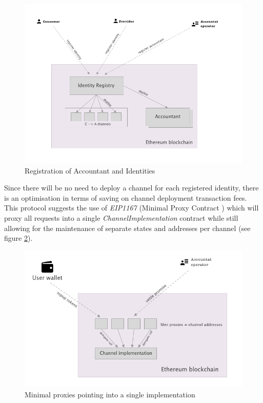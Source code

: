 \documentclass[a4paper,12pt]{article}
\begin{document}
\begin{figure}[H]
    \centering
    \includegraphics[scale=0.4]{../img/registration}
    \caption{Registration of Accountant and Identities}
    \label{img:registration}
\end{figure}

Since there will be no need to deploy a channel for each registered identity, 
there is an optimisation in terms of saving on channel deployment transaction 
fees. This protocol suggests the use of \textit{EIP1167} (Minimal Proxy Contract
\cite{eip1167}) which will proxy all requests into a single 
\textit{ChannelImplementation} contract while still allowing for the maintenance
of separate states and addresses per channel (see figure \ref{img:proxy}).

\begin{figure}[H]
    \centering
    \includegraphics[scale=0.5]{../img/proxy}
    \caption{Minimal proxies pointing into a single implementation}
    \label{img:proxy}
\end{figure}
\end{document}
